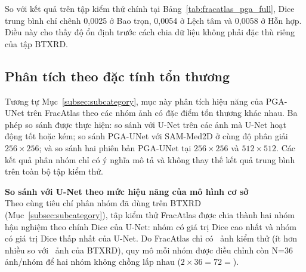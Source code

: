 So với kết quả trên tập kiểm thử chính tại Bảng~\ref{tab:fracatlas_pga_full}, Dice trung bình chỉ chênh 0,0025 ở Bao trọn, 0,0054 ở Lệch tâm và 0,0058 ở Hỗn hợp. Điều này cho thấy độ ổn định trước cách chia dữ liệu không phải đặc thù riêng của tập BTXRD.

\subsection{Phân tích theo đặc tính tổn thương}
\label{subsec:fracatlas_subcat}

Tương tự Mục~\ref{subsec:subcategory}, mục này phân tích hiệu năng của PGA-UNet trên FracAtlas theo các nhóm ảnh có đặc điểm tổn thương khác nhau. Ba phép so sánh được thực hiện: so sánh với U-Net trên các ảnh mà U-Net hoạt động tốt hoặc kém; so sánh PGA-UNet với SAM-Med2D ở cùng độ phân giải $256\times256$; và so sánh hai phiên bản PGA-UNet tại $256\times256$ và $512\times512$. Các kết quả phân nhóm chỉ có ý nghĩa mô tả và không thay thế kết quả trung bình trên toàn bộ tập kiểm thử.

\noindent\textbf{So sánh với U-Net theo mức hiệu năng của mô hình cơ sở}\\
Theo cùng tiêu chí phân nhóm đã dùng trên BTXRD (Mục~\ref{subsec:subcategory}), tập kiểm thử FracAtlas được chia thành hai nhóm hậu nghiệm theo chính Dice của U-Net: nhóm có giá trị Dice cao nhất và nhóm có giá trị Dice thấp nhất của U-Net. Do FracAtlas chỉ có \NtestimgFA~ảnh kiểm thử (ít hơn nhiều so với \Ntestimg~ảnh của BTXRD), quy mô mỗi nhóm được điều chỉnh còn N=36 ảnh/nhóm để hai nhóm không chồng lấp nhau ($2\times36=72=$\NtestimgFA).

